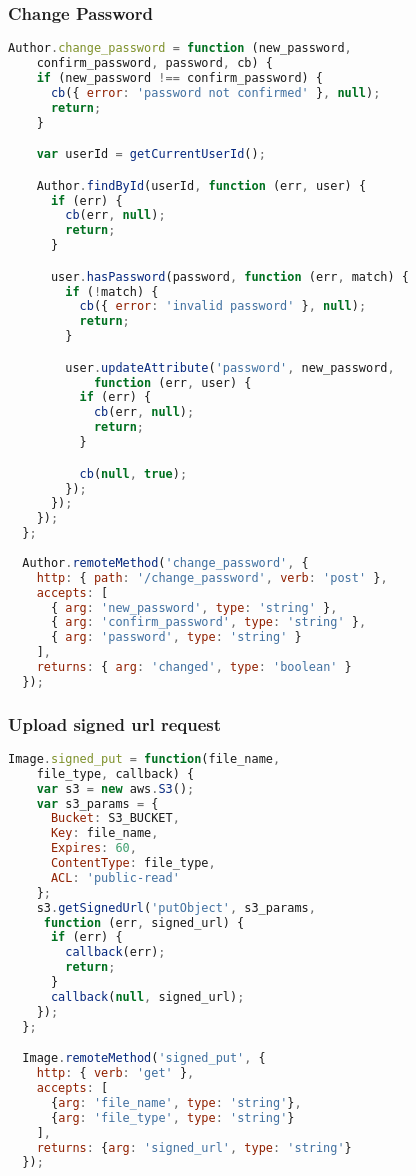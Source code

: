 \subsubsection{Change Password}

\begin{lstlisting}[language=javascript]
Author.change_password = function (new_password, 
	confirm_password, password, cb) {
    if (new_password !== confirm_password) {
      cb({ error: 'password not confirmed' }, null);
      return;
    }

    var userId = getCurrentUserId();  

    Author.findById(userId, function (err, user) {
      if (err) {
        cb(err, null);
        return;
      }

      user.hasPassword(password, function (err, match) {
        if (!match) {
          cb({ error: 'invalid password' }, null);
          return;
        }

        user.updateAttribute('password', new_password, 
        	function (err, user) {
          if (err) {
            cb(err, null);
            return;
          }

          cb(null, true);
        });
	  });       
    });
  };
   
  Author.remoteMethod('change_password', {
    http: { path: '/change_password', verb: 'post' },
    accepts: [
      { arg: 'new_password', type: 'string' },
      { arg: 'confirm_password', type: 'string' },
      { arg: 'password', type: 'string' }
    ],
    returns: { arg: 'changed', type: 'boolean' }
  });
\end{lstlisting}

\subsubsection{Upload signed url request}

\begin{lstlisting}[language=javascript]
Image.signed_put = function(file_name, 
	file_type, callback) {
    var s3 = new aws.S3();
    var s3_params = {
      Bucket: S3_BUCKET,
      Key: file_name,
      Expires: 60,
      ContentType: file_type,
      ACL: 'public-read'
    };
    s3.getSignedUrl('putObject', s3_params,
     function (err, signed_url) {
      if (err) {
        callback(err);
        return;
      }
      callback(null, signed_url);
    });
  };

  Image.remoteMethod('signed_put', {
    http: { verb: 'get' },
    accepts: [
      {arg: 'file_name', type: 'string'},
      {arg: 'file_type', type: 'string'}
    ],
    returns: {arg: 'signed_url', type: 'string'}
  });
\end{lstlisting}


